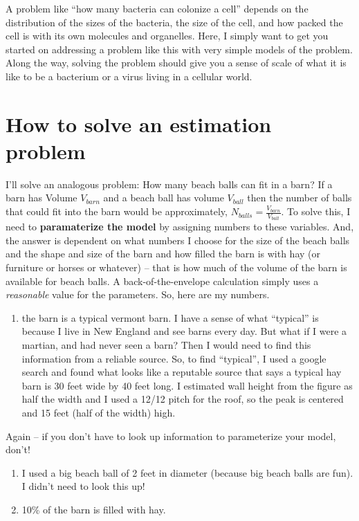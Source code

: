 \documentclass[]{book}
\providecommand{\tightlist}{%
  \setlength{\itemsep}{0pt}\setlength{\parskip}{0pt}}
\begin{document}
A problem like ``how many bacteria can colonize a cell'' depends on the
distribution of the sizes of the bacteria, the size of the cell, and how
packed the cell is with its own molecules and organelles. Here, I simply
want to get you started on addressing a problem like this with very
simple models of the problem. Along the way, solving the problem should
give you a sense of scale of what it is like to be a bacterium or a
virus living in a cellular world.

\section{How to solve an estimation
problem}\label{how-to-solve-an-estimation-problem}

I'll solve an analogous problem: How many beach balls can fit in a barn?
If a barn has Volume \(V_{barn}\) and a beach ball has volume
\(V_{ball}\) then the number of balls that could fit into the barn would
be approximately, \(N_{balls} = \frac{V_{barn}}{V_{ball}}\). To solve
this, I need to \textbf{paramaterize the model} by assigning numbers to
these variables. And, the answer is dependent on what numbers I choose
for the size of the beach balls and the shape and size of the barn and
how filled the barn is with hay (or furniture or horses or whatever) --
that is how much of the volume of the barn is available for beach balls.
A back-of-the-envelope calculation simply uses a \emph{reasonable} value
for the parameters. So, here are my numbers.

\begin{enumerate}
\def\labelenumi{\arabic{enumi}.}
\tightlist
\item
  the barn is a typical vermont barn. I have a sense of what ``typical''
  is because I live in New England and see barns every day. But what if
  I were a martian, and had never seen a barn? Then I would need to find
  this information from a reliable source. So, to find ``typical'', I
  used a google search and found what looks like a reputable source that
  says a typical hay barn is 30 feet wide by 40 feet long. I estimated
  wall height from the figure as half the width and I used a 12/12 pitch
  for the roof, so the peak is centered and 15 feet (half of the width)
  high.
\end{enumerate}

Again -- if you don't have to look up information to parameterize your
model, don't!

\begin{enumerate}
\def\labelenumi{\arabic{enumi}.}
\setcounter{enumi}{1}
\item
  I used a big beach ball of 2 feet in diameter (because big beach balls
  are fun). I didn't need to look this up!
\item
  10\% of the barn is filled with hay.
\end{enumerate}
\end{document}
